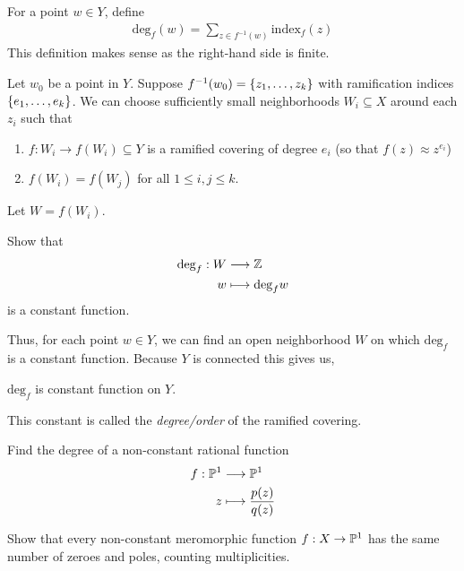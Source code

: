 \documentclass{article}
\begin{document}
\begin{definition}
  For a point $ w \in Y$, define
  \begin{align*}
    \mathrm{deg}_f(w) = \sum_{z \in f^{-1}(w)} \mathrm{index}_f (z)
  \end{align*}
  This definition makes sense as the right-hand side is finite.
\end{definition}

Let $w_0$ be a point in $Y$.
Suppose $f^{-1}(w_0) = \left\{z_1, \dots, z_k\right\}$ with ramification indices $\left\{e_1, \dots, e_k\right\}$. We can choose sufficiently small neighborhoods $W_i \subseteq X$ around each $z_i$ such that
\begin{enumerate}
  \item $f:W_i \rightarrow f(W_i) \subseteq Y$ is a ramified covering of degree $e_i$ (so that  $f(z) \approx z^{e_i}$)
  \item $f(W_i) = f(W_j)$ for all $1 \le i,j \le k$.
\end{enumerate}
Let $W = f(W_i)$.

\begin{qbox}
  Show that \begin{align*}
    \mathrm{deg}_f: W &\longrightarrow \mathbb{Z} \\
    w &\longmapsto \mathrm{deg}_f w
  \end{align*} is a constant function.
\end{qbox}

Thus, for each point $w \in Y$, we can find an open neighborhood $W$ on which $\mathrm{deg}_f$ is a constant function. Because $Y$ is connected this gives us,

\begin{theorem}
  $\mathrm{deg}_f$ is constant function on $Y$.
\end{theorem}
This constant is called the \emph{degree/order} of the ramified covering.

\begin{qbox}
  Find the degree of a non-constant rational function
  \begin{align*}
    f: \mathbb{P}^1 &\longrightarrow \mathbb{P}^1 \\
    z &\longmapsto \dfrac{p(z)}{q(z)}
  \end{align*}
\end{qbox}

\begin{qbox}
  Show that every non-constant meromorphic function $f:X \rightarrow \mathbb{P}^1$ has the same number of zeroes and poles, counting multiplicities.
\end{qbox}
\end{document}
